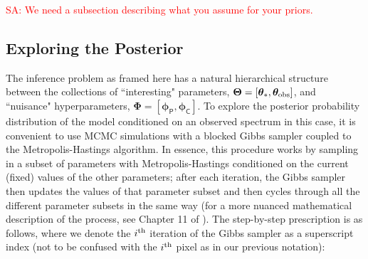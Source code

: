 \documentclass[iop,floatfix]{emulateapj}
\newcommand{\vt}{ {\bm \theta}}
\newcommand{\vT}{ {\bm \Theta}}
\newcommand{\vp}{ {\bm \phi}}
\newcommand{\vP}{ {\bm \Phi}}
\newcommand{\cheb}{ \vp_{\mathsf{P}}}
\newcommand{\cov}{ \vp_{\mathsf{C}}}
\newcommand{\comm}[1]{ \textcolor{red}{SA: #1}}
\begin{document}
\comm{We need a subsection describing what you assume for your priors.}


\subsection{Exploring the Posterior} \label{subsec:MCMC}

The inference problem as framed here has a natural hierarchical structure between the collections 
of ``interesting" parameters, $\vT = [\vt_{\ast}, \vt_{\rm obs}]$, and ``nuisance" hyperparameters, 
$\vP = [\cheb, \cov]$.  To explore the posterior probability distribution of the model conditioned 
on an observed spectrum in this case, it is convenient to use MCMC simulations with a blocked Gibbs 
sampler coupled to the Metropolis-Hastings algorithm.  In essence, this procedure works by sampling 
in a subset of parameters with Metropolis-Hastings conditioned on the current (fixed) values of the 
other parameters; after each iteration, the Gibbs sampler then updates the values of that parameter 
subset and then cycles through all the different parameter subsets in the same way (for a more 
nuanced mathematical description of the process, see Chapter 11 of \citealt{gelman13}).  The 
step-by-step prescription is as follows, where we denote the $i^{\rm th}$ iteration of the Gibbs 
sampler as a superscript index (not to be confused with the $i^{\rm th}$ pixel as in our previous 
notation):
\end{document}
